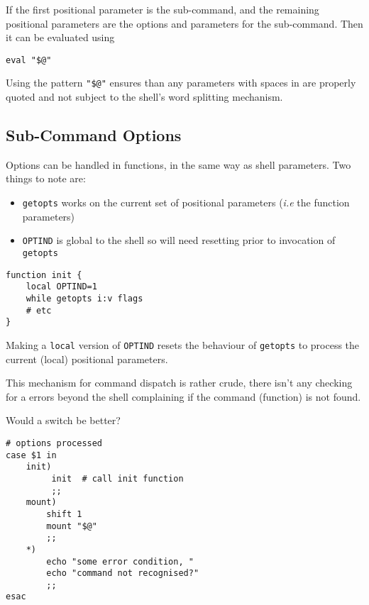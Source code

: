 \documentclass[12pt]{article}
\begin{document}
If the first positional parameter is the sub-command, and the remaining positional parameters are the 
options and parameters for the sub-command.  Then it can be evaluated using 
\begin{tcolorbox}[title=sub-command evaluation]
\begin{verbatim}
eval "$@"
\end{verbatim}
\end{tcolorbox}
Using the pattern \verb:"$@": ensures than any parameters with spaces in are properly quoted 
and not subject to the shell's word splitting mechanism.
\subsection{Sub-Command Options}
Options can be handled in functions, in the same way as shell parameters.
Two things to note are:
\begin{itemize}
\item \verb:getopts: works on the current set of positional parameters (\textit{i.e} the function parameters)
\item \verb:OPTIND: is global to the shell so will need resetting prior to invocation of \verb:getopts:
\end{itemize}
\begin{tcolorbox}[title=function option handling]
\begin{verbatim}
function init {
    local OPTIND=1
    while getopts i:v flags
    # etc
}
\end{verbatim}
\end{tcolorbox}
Making a \verb:local: version of \verb:OPTIND: resets the behaviour of \verb:getopts: to process the
current (local) positional parameters.

\begin{tcolorbox}[colframe=red]
This mechanism for command dispatch is rather crude, there isn't any checking for a errors
beyond the shell complaining if the command (function) is not found.

Would a switch be better?
\begin{tcolorbox}
\begin{verbatim}
# options processed
case $1 in
    init)
         init  # call init function
         ;;
    mount)
        shift 1
        mount "$@"
        ;;
    *)
        echo "some error condition, "
        echo "command not recognised?"
        ;;
esac
\end{verbatim}
\end{tcolorbox}

\end{tcolorbox}
\end{document}
